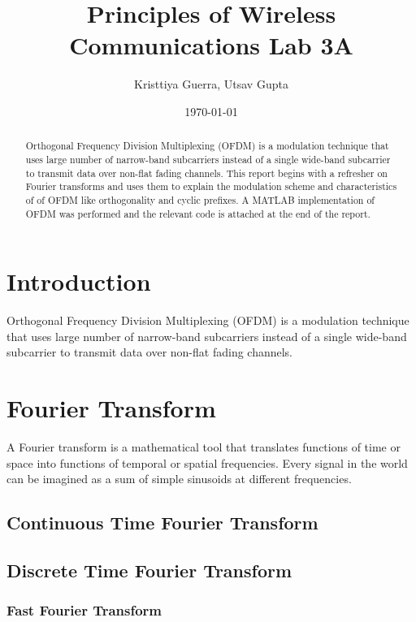 \documentclass{article}
\title{Principles of Wireless Communications Lab 3A}
\author{Kristtiya Guerra, Utsav Gupta} %
\date{\today}
\begin{document}
\maketitle

\begin{abstract}
    Orthogonal Frequency Division Multiplexing (OFDM) is a modulation technique that uses large number of narrow-band subcarriers instead of a single wide-band subcarrier to transmit data over non-flat fading channels. This report begins with a refresher on Fourier transforms and uses them to explain the modulation scheme and characteristics of of OFDM like orthogonality and cyclic prefixes. A MATLAB implementation of OFDM was performed and the relevant code is attached at the end of the report.
\end{abstract}

\section{Introduction}

Orthogonal Frequency Division Multiplexing (OFDM) is a modulation technique that uses large number of narrow-band subcarriers instead of a single wide-band subcarrier to transmit data over non-flat fading channels.

\section{Fourier Transform}
A Fourier transform is a mathematical tool that translates functions of time or space into functions of temporal or spatial frequencies. Every signal in the world can be imagined as a sum of simple sinusoids at different frequencies.    

\subsection{Continuous Time Fourier Transform}

\subsection{Discrete Time Fourier Transform}

\subsubsection{Fast Fourier Transform}
\end{document}
